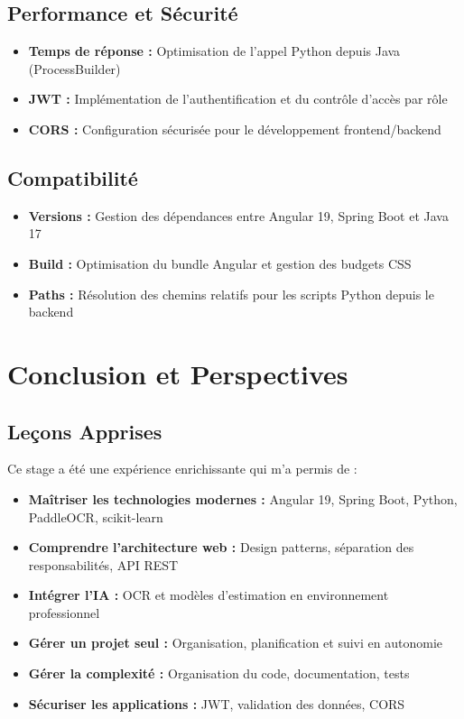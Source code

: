\documentclass[12pt,a4paper]{article}
\begin{document}
\subsection{Performance et Sécurité}
\begin{itemize}
    \item \textbf{Temps de réponse :} Optimisation de l'appel Python depuis Java (ProcessBuilder)
    \item \textbf{JWT :} Implémentation de l'authentification et du contrôle d'accès par rôle
    \item \textbf{CORS :} Configuration sécurisée pour le développement frontend/backend
\end{itemize}

\subsection{Compatibilité}
\begin{itemize}
    \item \textbf{Versions :} Gestion des dépendances entre Angular 19, Spring Boot et Java 17
    \item \textbf{Build :} Optimisation du bundle Angular et gestion des budgets CSS
    \item \textbf{Paths :} Résolution des chemins relatifs pour les scripts Python depuis le backend
\end{itemize}

\section{Conclusion et Perspectives}

\subsection{Leçons Apprises}
Ce stage a été une expérience enrichissante qui m'a permis de :

\begin{itemize}
    \item \textbf{Maîtriser les technologies modernes :} Angular 19, Spring Boot, Python, PaddleOCR, scikit-learn
    \item \textbf{Comprendre l'architecture web :} Design patterns, séparation des responsabilités, API REST
    \item \textbf{Intégrer l'IA :} OCR et modèles d'estimation en environnement professionnel
    \item \textbf{Gérer un projet seul :} Organisation, planification et suivi en autonomie
    \item \textbf{Gérer la complexité :} Organisation du code, documentation, tests
    \item \textbf{Sécuriser les applications :} JWT, validation des données, CORS
\end{itemize}
\end{document}
